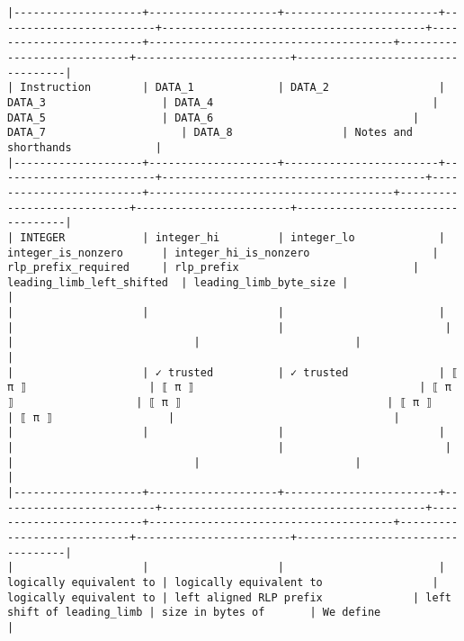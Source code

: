 \documentclass[varwidth=\maxdimen,margin=0.5cm,multi={verbatim}]{standalone}
\begin{document}
\begin{verbatim}
|--------------------+--------------------+------------------------+-------------------------+-----------------------------------------+-------------------------+--------------------------------------+----------------------------+------------------------+----------------------------------|
| Instruction        | DATA_1             | DATA_2                 | DATA_3                  | DATA_4                                  | DATA_5                  | DATA_6                               | DATA_7                     | DATA_8                 | Notes and shorthands             |
|--------------------+--------------------+------------------------+-------------------------+-----------------------------------------+-------------------------+--------------------------------------+----------------------------+------------------------+----------------------------------|
| INTEGER            | integer_hi         | integer_lo             | integer_is_nonzero      | integer_hi_is_nonzero                   | rlp_prefix_required     | rlp_prefix                           | leading_limb_left_shifted  | leading_limb_byte_size |                                  |
|                    |                    |                        |                         |                                         |                         |                                      |                            |                        |                                  |
|                    | ✓ trusted          | ✓ trusted              | ⟦ π ⟧                   | ⟦ π ⟧                                   | ⟦ π ⟧                   | ⟦ π ⟧                                | ⟦ π ⟧                      | ⟦ π ⟧                  |                                  |
|                    |                    |                        |                         |                                         |                         |                                      |                            |                        |                                  |
|--------------------+--------------------+------------------------+-------------------------+-----------------------------------------+-------------------------+--------------------------------------+----------------------------+------------------------+----------------------------------|
|                    |                    |                        | logically equivalent to | logically equivalent to                 | logically equivalent to | left aligned RLP prefix              | left shift of leading_limb | size in bytes of       | We define                        |

\end{verbatim}
\end{document}
